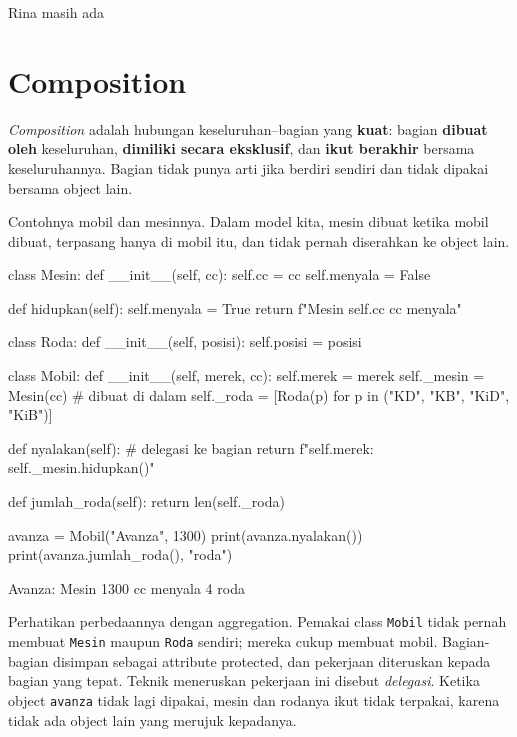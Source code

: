 \begin{keluaran}
Rina masih ada
\end{keluaran}

\section{Composition}

\emph{Composition} adalah hubungan keseluruhan--bagian yang \textbf{kuat}: bagian \textbf{dibuat oleh} keseluruhan, \textbf{dimiliki secara eksklusif}, dan \textbf{ikut berakhir} bersama keseluruhannya. Bagian tidak punya arti jika berdiri sendiri dan tidak dipakai bersama object lain.

Contohnya mobil dan mesinnya. Dalam model kita, mesin dibuat ketika mobil dibuat, terpasang hanya di mobil itu, dan tidak pernah diserahkan ke object lain.

\begin{kode}[Composition]
class Mesin:
    def __init__(self, cc):
        self.cc = cc
        self.menyala = False

    def hidupkan(self):
        self.menyala = True
        return f"Mesin {self.cc} cc menyala"

class Roda:
    def __init__(self, posisi):
        self.posisi = posisi

class Mobil:
    def __init__(self, merek, cc):
        self.merek = merek
        self._mesin = Mesin(cc)                           # dibuat di dalam
        self._roda = [Roda(p) for p in ("KD", "KB", "KiD", "KiB")]

    def nyalakan(self):                                   # delegasi ke bagian
        return f"{self.merek}: {self._mesin.hidupkan()}"

    def jumlah_roda(self):
        return len(self._roda)

avanza = Mobil("Avanza", 1300)
print(avanza.nyalakan())
print(avanza.jumlah_roda(), "roda")
\end{kode}

\begin{keluaran}
Avanza: Mesin 1300 cc menyala
4 roda
\end{keluaran}

Perhatikan perbedaannya dengan aggregation. Pemakai class \texttt{Mobil} tidak pernah membuat \texttt{Mesin} maupun \texttt{Roda} sendiri; mereka cukup membuat mobil. Bagian-bagian disimpan sebagai attribute protected, dan pekerjaan diteruskan kepada bagian yang tepat. Teknik meneruskan pekerjaan ini disebut \emph{delegasi}. Ketika object \texttt{avanza} tidak lagi dipakai, mesin dan rodanya ikut tidak terpakai, karena tidak ada object lain yang merujuk kepadanya.

